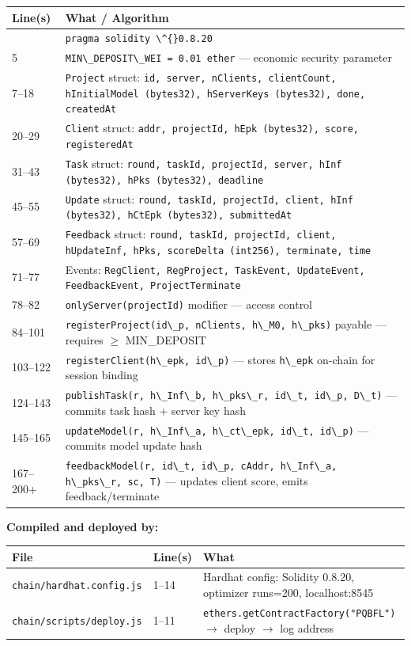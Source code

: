 \documentclass[11pt,a4paper]{article}
\newcommand{\code}[1]{\lstinline[basicstyle=\ttfamily\small]!#1!}
\begin{document}
\begin{longtable}{L{2.2cm} L{11.5cm}}
\toprule
\textbf{Line(s)} & \textbf{What / Algorithm} \\
\midrule
\endhead
\bottomrule
{}       & \code{pragma solidity \^{}0.8.20} \\
5       & \code{MIN\_DEPOSIT\_WEI = 0.01 ether} --- economic security parameter \\
7--18   & \code{Project} struct: \code{id, server, nClients, clientCount, hInitialModel (bytes32), hServerKeys (bytes32), done, createdAt} \\
20--29  & \code{Client} struct: \code{addr, projectId, hEpk (bytes32), score, registeredAt} \\
31--43  & \code{Task} struct: \code{round, taskId, projectId, server, hInf (bytes32), hPks (bytes32), deadline} \\
45--55  & \code{Update} struct: \code{round, taskId, projectId, client, hInf (bytes32), hCtEpk (bytes32), submittedAt} \\
57--69  & \code{Feedback} struct: \code{round, taskId, projectId, client, hUpdateInf, hPks, scoreDelta (int256), terminate, time} \\
71--77  & Events: \code{RegClient, RegProject, TaskEvent, UpdateEvent, FeedbackEvent, ProjectTerminate} \\
78--82  & \code{onlyServer(projectId)} modifier --- access control \\
84--101 & \code{registerProject(id\_p, nClients, h\_M0, h\_pks)} payable --- requires $\geq$ MIN\_DEPOSIT \\
103--122 & \code{registerClient(h\_epk, id\_p)} --- stores \code{h\_epk} on-chain for session binding \\
124--143 & \code{publishTask(r, h\_Inf\_b, h\_pks\_r, id\_t, id\_p, D\_t)} --- commits task hash + server key hash \\
145--165 & \code{updateModel(r, h\_Inf\_a, h\_ct\_epk, id\_t, id\_p)} --- commits model update hash \\
167--200+ & \code{feedbackModel(r, id\_t, id\_p, cAddr, h\_Inf\_a, h\_pks\_r, sc, T)} --- updates client score, emits feedback/terminate \\
\end{longtable}

\textbf{Compiled and deployed by:}

\begin{longtable}{L{4.5cm} L{1.8cm} L{8cm}}
\toprule
\textbf{File} & \textbf{Line(s)} & \textbf{What} \\
\midrule
\endhead
\bottomrule
\endfoot
\code{chain/hardhat.config.js} & 1--14 & Hardhat config: Solidity 0.8.20, optimizer runs=200, localhost:8545 \\
\code{chain/scripts/deploy.js} & 1--11 & \code{ethers.getContractFactory("PQBFL")} $\to$ deploy $\to$ log address \\
\end{longtable}
\end{document}
